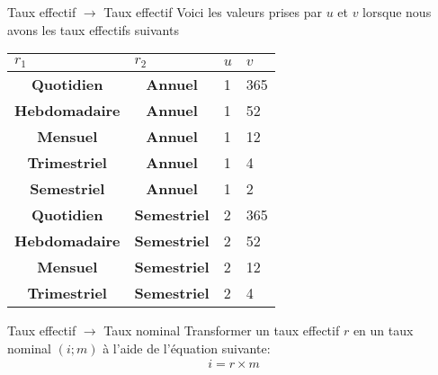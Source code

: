 \documentclass{beamer}
\begin{document}
\begin{frame}{Taux effectif $\rightarrow$ Taux effectif}
Voici les valeurs prises par $u$ et $v$ lorsque nous avons les taux effectifs suivants 


\begin{table}[H]
\begin{center}
\begin{tabular}{|c|c|l|l|}
\hline
\multicolumn{1}{|l|}{\textbf{$r_1$}} & \multicolumn{1}{l|}{\textbf{$r_2$}} & \textbf{$u$} & \textbf{$v$} \\ \hline
\textbf{Quotidien}                   & \textbf{Annuel}                     & 1            & 365          \\ \hline
\textbf{Hebdomadaire}                & \textbf{Annuel}                     & 1            & 52           \\ \hline
\textbf{Mensuel}                     & \textbf{Annuel}                     & 1            & 12           \\ \hline
\textbf{Trimestriel}                 & \textbf{Annuel}                     & 1            & 4            \\ \hline
\textbf{Semestriel}                  & \textbf{Annuel}                     & 1            & 2            \\ \hline
\textbf{Quotidien}                   & \textbf{Semestriel}                 & 2            & 365          \\ \hline
\textbf{Hebdomadaire}                & \textbf{Semestriel}                 & 2            & 52           \\ \hline
\textbf{Mensuel}                     & \textbf{Semestriel}                 & 2            & 12           \\ \hline
\textbf{Trimestriel}                 & \textbf{Semestriel}                 & 2            & 4            \\ \hline
\end{tabular}
\end{center}
\end{table}
\end{frame}

\begin{frame}{Taux effectif $\rightarrow$ Taux nominal}
Transformer un taux effectif $r$ en un taux nominal $(i;m)$ à l'aide de l'équation suivante:
\begin{align*}
i = r \times m
\end{align*}
\end{frame}
\end{document}
